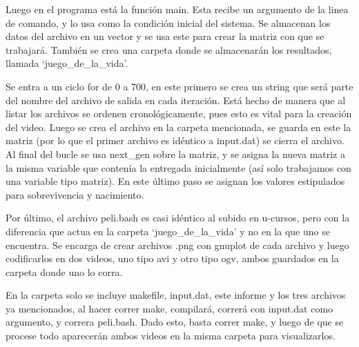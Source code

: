 \documentclass[12pt]{article}
\begin{document}
Luego en el programa está la función main. Esta recibe un argumento de la linea de comando, y lo usa como la condición inicial del sistema. Se almacenan los datos del archivo en un vector y se usa este para crear la matriz con que se trabajará. También se crea una carpeta donde se almacenarán los resultados, llamada `juego\_de\_la\_vida'.

Se entra a un ciclo for de 0 a 700, en este primero se crea un string que será parte del nombre del archivo de salida en cada iteración. Está hecho de manera que al listar los archivos se ordenen cronológicamente, pues esto es vital para la creación del video. Luego se crea el archivo en la carpeta mencionada, se guarda en este la matriz (por lo que el primer archivo es idéntico a input.dat) se cierra el archivo. Al final del bucle se usa next\_gen sobre la matriz, y se asigna la nueva matriz a la misma variable que contenía la entregada inicialmente (así solo trabajamos con una variable tipo matriz). En este último paso se asignan los valores estipulados para sobrevivencia y nacimiento.

Por último, el archivo peli.bash es casi idéntico al subido en u-cursos, pero con la diferencia que actua en la carpeta `juego\_de\_la\_vida' y no en la que uno se encuentra. Se encarga de crear archivos .png con gnuplot de cada archivo y luego codificarlos en dos videos, uno tipo avi y otro tipo ogv, ambos guardados en la carpeta donde uno lo corra.

En la carpeta solo se incluye makefile, input.dat, este informe y los tres archivos ya mencionados, al hacer correr make, compilará, correrá con input.dat como argumento, y correra peli.bash. Dado esto, basta correr make, y luego de que se procese todo aparecerán ambos videos en la misma carpeta para visualizarlos.
\end{document}
